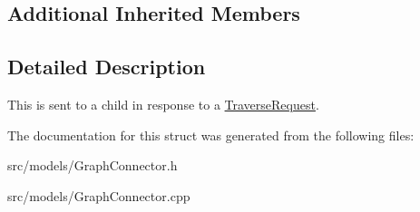 \subsection*{Additional Inherited Members}


\subsection{Detailed Description}
This is sent to a child in response to a \hyperlink{struct_graph_connector_1_1_traverse_request}{Traverse\+Request}. 

The documentation for this struct was generated from the following files\+:\begin{DoxyCompactItemize}
\item 
src/models/Graph\+Connector.\+h\item 
src/models/Graph\+Connector.\+cpp\end{DoxyCompactItemize}
